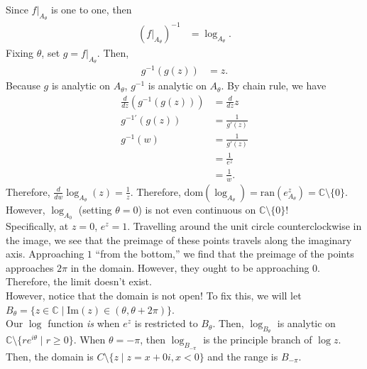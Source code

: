 \documentclass[10pt]{extarticle}
\newcommand{\C}{\mathbb{C}}
\begin{document}
  Since $f\big|_{A_\theta}$ is one to one, then
  \begin{align*}
    \left(f\big|_{A_{\theta}}\right)^{-1} &= \log_{A_{\theta}}.
  \end{align*}
  Fixing $\theta$, set $g = f\big|_{A_{\theta}}$. Then,
  \begin{align*}
    g^{-1}(g(z)) &= z.
  \end{align*}
  Because $g$ is analytic on $A_{\theta}$, $g^{-1}$ is analytic on $A_{\theta}$. By chain rule, we have
  \begin{align*}
    \frac{d}{dz} (g^{-1}(g(z))) &= \frac{d}{dz}z\\
    g^{-1'}(g(z)) &= \frac{1}{g'(z)} \tag*{$g'(z)\neq 0$}\\
    g^{-1}(w) &= \frac{1}{g'(z)}\tag*{$w = e^z$}\\
              &= \frac{1}{e^{z}}\\
              &= \frac{1}{w}.
  \end{align*}
  Therefore, $\frac{d}{dw}\log_{A_{\theta}}(z) = \frac{1}{z}$. Therefore, $\text{dom}(\log_{A_{\theta}}) = \text{ran}(e^{z}_{A_{\theta}}) = \C\setminus \{0\}$. However, $\log_{A_{0}}$ (setting $\theta = 0$) is not even continuous on $\C\setminus \{0\}$!\\

  Specifically, at $z = 0$, $e^z = 1$. Travelling around the unit circle counterclockwise in the image, we see that the preimage of these points travels along the imaginary axis. Approaching $1$ ``from the bottom,'' we find that the preimage of the points approaches $2\pi$ in the domain. However, they ought to be approaching $0$. Therefore, the limit doesn't exist.\\

  However, notice that the domain is not open! To fix this, we will let $B_{\theta} = \{z\in \C\mid \text{Im}(z) \in (\theta,\theta + 2\pi)\}$.\\

  Our $\log$ function \textit{is} when $e^z$ is restricted to $B_{\theta}$. Then, $\log_{B_{\theta}}$ is analytic on $\C\setminus\{re^{i\theta}\mid r\geq 0\}$. When $\theta = -\pi$, then $\log_{B_{-\pi}}$ is the principle branch of $\log z$.\\

  Then, the domain is $C\setminus \{z\mid z = x + 0i, x < 0\}$ and the range is $B_{-\pi}$.
\end{document}
